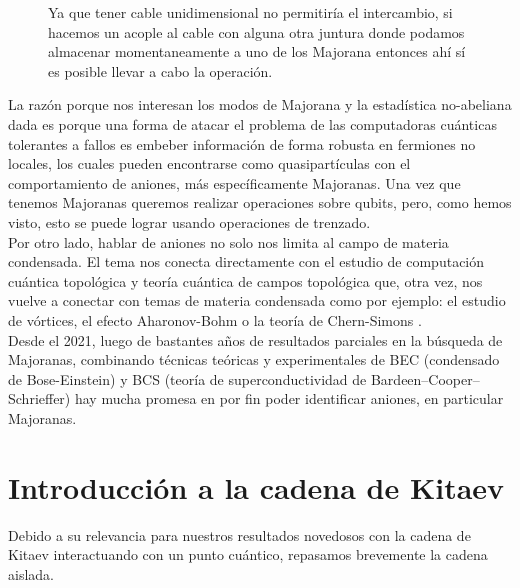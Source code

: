 \begin{figure}[ht]
\centering
{}
\caption{Ya que tener cable unidimensional no permitir\'{i}a el intercambio, si hacemos un acople al cable con alguna otra juntura donde podamos almacenar momentaneamente a uno de los Majorana entonces ah\'{i} s\'{i} es posible llevar a cabo la operaci\'{o}n.}
\label{fig:braiding2}
\end{figure}
La raz\'{o}n porque nos interesan los modos de Majorana y la estad\'{i}stica no-abeliana dada es porque una forma de atacar el problema de las computadoras cu\'{a}nticas tolerantes a fallos \cite{KITAEV20032}\cite{Bravyi2000FermionicQC} es embeber informaci\'{o}n de forma robusta en fermiones no locales, los cuales pueden encontrarse como quasipart\'{i}culas con el comportamiento de aniones, m\'{a}s espec\'{i}ficamente Majoranas. Una vez que tenemos Majoranas queremos realizar operaciones sobre qubits, pero, como hemos visto, esto se puede lograr usando operaciones de trenzado.\\
Por otro lado, hablar de aniones no solo nos limita al campo de materia condensada. El tema nos conecta directamente con el estudio de computaci\'{o}n cu\'{a}ntica topol\'{o}gica \cite{freedman2000} y teor\'{i}a cu\'{a}ntica de campos topol\'{o}gica \cite{lancaster2014quantum}\cite{ZeeQuantum} que, otra vez, nos vuelve a conectar con temas de materia condensada como por ejemplo: el estudio de v\'{o}rtices, el efecto Aharonov-Bohm o la teor\'{i}a de Chern-Simons \cite{Witten}.\\
Desde el 2021, luego de bastantes a\~{n}os de resultados parciales en la b\'{u}squeda de Majoranas, combinando t\'{e}cnicas te\'{o}ricas y experimentales de BEC (condensado de Bose-Einstein) y BCS (teor\'{i}a de superconductividad de Bardeen–Cooper–Schrieffer) \cite{anyonsandmajo} hay mucha promesa en por fin poder identificar aniones, en particular Majoranas.
\section{Introducci\'{o}n a la cadena de Kitaev}
Debido a su relevancia para nuestros resultados novedosos con la cadena de Kitaev interactuando con un punto cu\'{a}ntico, repasamos brevemente la cadena aislada.

